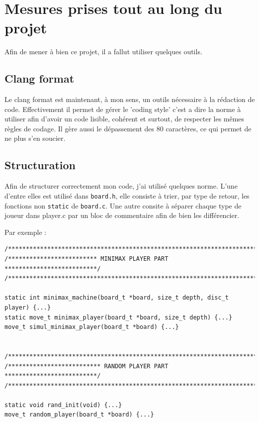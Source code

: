 \documentclass{report}
\begin{document}
\chapter{Mesures prises tout au long du projet}

Afin de mener à bien ce projet, il a fallut utiliser quelques outils.

\section{Clang format}
Le clang format est maintenant, à mon sens, un outils nécessaire à la rédaction de code. Effectivement il permet de gérer le 'coding style' c'est a dire la norme à utiliser afin d'avoir un code lisible, cohérent et surtout, de respecter les mêmes règles de codage. Il gère aussi le dépassement des 80 caractères, ce qui permet de ne plus s'en soucier.

\section{Structuration}
Afin de structurer correctement mon code, j'ai utilisé quelques norme. L'une d'entre elles est utilisé dans \texttt{board.h}, elle consiste à trier, par type de retour, les fonctions non \texttt{static} de \texttt{board.c}. Une autre consite à séparer chaque type de joueur dans player.c par un bloc de commentaire afin de bien les différencier.\newline

Par exemple : \newline

\begin{lstlisting}
/************************************************************************/
/************************* MINIMAX PLAYER PART **************************/
/************************************************************************/

static int minimax_machine(board_t *board, size_t depth, disc_t player) {...}
static move_t minimax_player(board_t *board, size_t depth) {...}
move_t simul_minimax_player(board_t *board) {...}


/************************************************************************/
/************************** RANDOM PLAYER PART **************************/
/************************************************************************/

static void rand_init(void) {...}
move_t random_player(board_t *board) {...}
\end{lstlisting}
\end{document}
